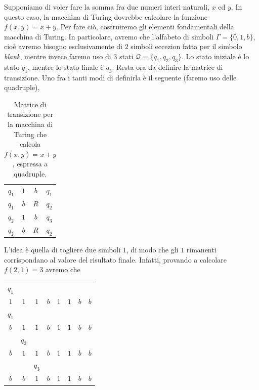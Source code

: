 \documentclass[10pt]{\classname}
\begin{document}
Supponiamo di voler fare la somma fra due numeri interi naturali, $x$ ed $y$.
In questo caso, la macchina di Turing dovrebbe calcolare la funzione $f(x,y) =
x + y$. Per fare ciò, costruiremo gli elementi fondamentali della macchina di
Turing. In particolare, avremo che l'alfabeto di simboli $\Gamma = \{0, 1,
b\}$, cioè avremo bisogno esclusivamente di $2$ simboli eccezion fatta per il
simbolo \emph{blank}, mentre invece faremo uso di $3$ stati $\mathcal Q =
\{q_1, q_2, q_3\}$. Lo stato iniziale è lo stato $q_1$, mentre lo stato finale
è $q_3$. Resta ora da definire la matrice di transizione. Uno fra i tanti modi
di definirla è il seguente (faremo uso delle quadruple),


\begin{table}[ht]
\centering
\begin{tabular}{cccc}
    $q_1$ & $1$ & $b$ & $q_1$\\
    $q_1$ & $b$ & $R$ & $q_2$\\
    $q_2$ & $1$ & $b$ & $q_3$\\
    $q_2$ & $b$ & $R$ & $q_2$

\end{tabular}
\caption{Matrice di transizione per la macchina di Turing che calcola $f(x,y) =
x + y$, espressa a quadruple.}\label{tab:mdtSomma}
\end{table}
\bigskip

L'idea è quella di togliere due simboli $1$, di modo che gli $1$ rimanenti
corrispondano al valore del risultato finale. Infatti, provando a calcolare
$f(2, 1) = 3$ avremo che

\begin{table}[ht]
\centering
\begin{tabular}{cccccccc}
   $q_1$&     &     &     &     &     &     &     \\
    $1$ & $1$ & $1$ & $b$ & $1$ & $1$ & $b$ & $b$ \\
   $q_1$&     &     &     &     &     &     &     \\
    $b$ & $1$ & $1$ & $b$ & $1$ & $1$ & $b$ & $b$ \\
        &$q_2$&     &     &     &     &     &     \\
    $b$ & $1$ & $1$ & $b$ & $1$ & $1$ & $b$ & $b$ \\
        &     &$q_3$&     &     &     &     &     \\
    $b$ & $b$ & $1$ & $b$ & $1$ & $1$ & $b$ & $b$
\end{tabular}
\end{table}
\bigskip
\end{document}

